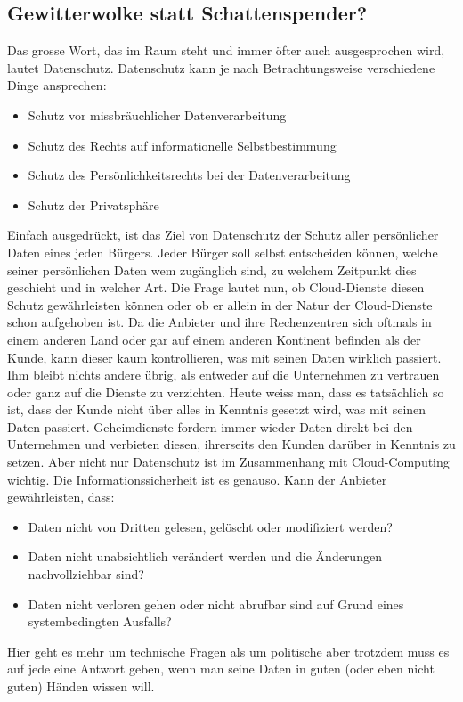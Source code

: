 \subsection{Gewitterwolke statt Schattenspender?}
Das grosse Wort, das im Raum steht und immer öfter auch ausgesprochen wird, lautet Datenschutz. Datenschutz kann je nach Betrachtungsweise verschiedene Dinge ansprechen:
\begin{itemize}
\item Schutz vor missbräuchlicher Datenverarbeitung
\item Schutz des Rechts auf informationelle Selbstbestimmung
\item Schutz des Persönlichkeitsrechts bei der Datenverarbeitung
\item Schutz der Privatsphäre
\end{itemize}

Einfach ausgedrückt, ist das Ziel von Datenschutz der Schutz aller persönlicher Daten eines jeden Bürgers. Jeder Bürger soll selbst entscheiden können, welche seiner persönlichen Daten wem zugänglich sind, zu welchem Zeitpunkt dies geschieht und in welcher Art. Die Frage lautet nun, ob Cloud-Dienste diesen Schutz gewährleisten können oder ob er allein in der Natur der Cloud-Dienste schon aufgehoben ist. Da die Anbieter und ihre Rechenzentren sich oftmals in einem anderen Land oder gar auf einem anderen Kontinent befinden als der Kunde, kann dieser kaum kontrollieren, was mit seinen Daten wirklich passiert. Ihm bleibt nichts andere übrig, als entweder auf die Unternehmen zu vertrauen oder ganz auf die Dienste zu verzichten. Heute weiss man, dass es tatsächlich so ist, dass der Kunde nicht über alles in Kenntnis gesetzt wird, was mit seinen Daten passiert. Geheimdienste fordern immer wieder Daten direkt bei den Unternehmen und verbieten diesen, ihrerseits den Kunden darüber in Kenntnis zu setzen. Aber nicht nur Datenschutz ist im Zusammenhang mit Cloud-Computing wichtig. Die Informationssicherheit ist es genauso.
Kann der Anbieter gewährleisten, dass:
\begin{itemize}
\item Daten nicht von Dritten gelesen, gelöscht oder modifiziert werden?
\item Daten nicht unabsichtlich verändert werden und die Änderungen nachvollziehbar sind?
\item Daten nicht verloren gehen oder nicht abrufbar sind auf Grund eines systembedingten Ausfalls?
\end{itemize}
Hier geht es mehr um technische Fragen als um politische aber trotzdem muss es auf jede eine Antwort geben, wenn man seine Daten in guten (oder eben nicht guten) Händen wissen will.


